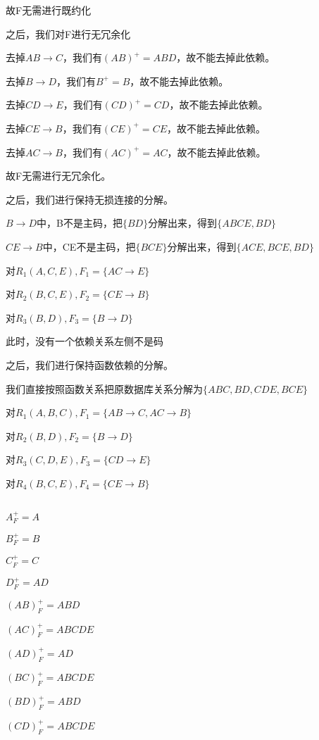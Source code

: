 \documentclass[UTF8]{ctexart}
\begin{document}
故F无需进行既约化

之后，我们对F进行无冗余化

去掉$AB\rightarrow C$，我们有$(AB)^+ = ABD$，故不能去掉此依赖。

去掉$B\rightarrow D$，我们有$B^+ = B$，故不能去掉此依赖。

去掉$CD\rightarrow E$，我们有$(CD)^+ = CD$，故不能去掉此依赖。

去掉$CE\rightarrow B$，我们有$(CE)^+ = CE$，故不能去掉此依赖。

去掉$AC\rightarrow B$，我们有$(AC)^+ = AC$，故不能去掉此依赖。

故F无需进行无冗余化。

之后，我们进行保持无损连接的分解。

$B\rightarrow D$中，B不是主码，把$\{BD\}$分解出来，得到$\{ABCE, BD\}$

$CE\rightarrow B$中，CE不是主码，把$\{BCE\}$分解出来，得到$\{ACE, BCE, BD\}$

对$R_1(A, C, E), F_1 = \{AC\rightarrow E\}$

对$R_2(B, C, E), F_2 = \{CE\rightarrow B\}$

对$R_3(B, D), F_3 = \{B\rightarrow D\}$

此时，没有一个依赖关系左侧不是码

之后，我们进行保持函数依赖的分解。

我们直接按照函数关系把原数据库关系分解为$\{ABC, BD, CDE, BCE\}$

对$R_1(A, B, C), F_1 = \{AB\rightarrow C, AC\rightarrow B\}$

对$R_2(B, D), F_2 = \{B\rightarrow D\}$

对$R_3(C, D, E), F_3 = \{CD\rightarrow E\}$

对$R_4(B, C, E), F_4 = \{CE\rightarrow B\}$

\subsection{}

$A_F^+ = A$

$B_F^+ = B$

$C_F^+ = C$

$D_F^+ = AD$

$(AB)_F^+ = ABD$

$(AC)_F^+ = ABCDE$

$(AD)_F^+ = AD$

$(BC)_F^+ = ABCDE$

$(BD)_F^+ = ABD$

$(CD)_F^+ = ABCDE$
\end{document}

